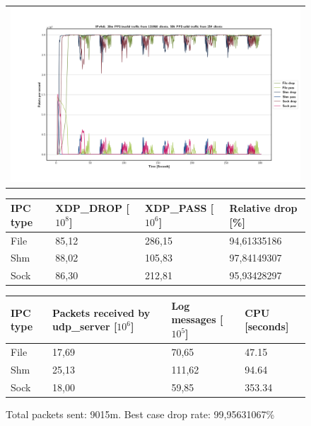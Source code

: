 \begin{figure}[!h]
	\centering
	\scriptsize
	\begin{tabular}{c}
    	\centerline{\includegraphics[width=1.2\textwidth]{images/IPv4v6_30m_131068_2.png}}
	\end{tabular}
	\begin{tabular}{llll}
		\toprule
		\textbf{IPC type} & \textbf{XDP\_DROP [$10^8$]} & \textbf{XDP\_PASS [$10^6$]} & \textbf{Relative drop [\%]} \\ \midrule 
		File & 85,12 & 286,15 & 94,61335186 \\
        Shm & 88,02 & 105,83 & 97,84149307 \\
        Sock & 86,30 & 212,81 & 95,93428297 \\
	\bottomrule
	\end{tabular}
    \begin{tabular}{llll}
		\toprule
		\textbf{IPC type} & \textbf{Packets received by udp\_server [$10^6$]} & \textbf{Log messages [$10^5$]} & \textbf{CPU [seconds]} \\ \midrule 
		File & 17,69 & 70,65 & 47.15 \\
        Shm & 25,13 & 111,62 & 94.64 \\
        Sock & 18,00 & 59,85 & 353.34 \\
	\bottomrule
	\end{tabular}
	\caption[Simplefail2ban, IPv4v6, 30m \ac{PPS}, 131068 malicious clients]{Total packets sent: 9015m. Best case drop rate: 99,95631067\%}
	\label{fig:data:ipv4v6:30m:131068}
\end{figure}


